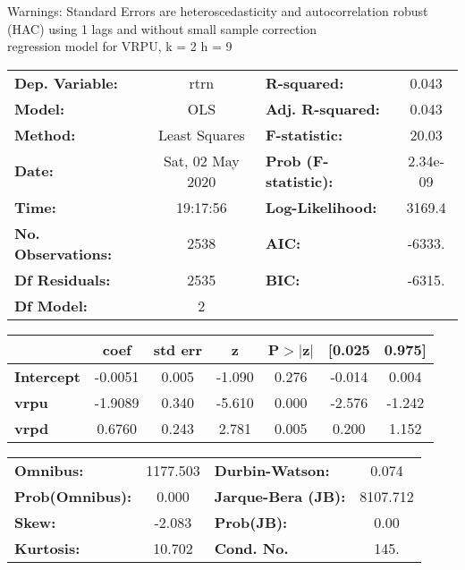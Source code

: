 Warnings: \newline
 [1] Standard Errors are heteroscedasticity and autocorrelation robust (HAC) using 1 lags and without small sample correction\\ 

regression model for VRPU, k = 2 h = 9\begin{center}
\begin{tabular}{lclc}
\toprule
\textbf{Dep. Variable:}    &       rtrn       & \textbf{  R-squared:         } &     0.043   \\
\textbf{Model:}            &       OLS        & \textbf{  Adj. R-squared:    } &     0.043   \\
\textbf{Method:}           &  Least Squares   & \textbf{  F-statistic:       } &     20.03   \\
\textbf{Date:}             & Sat, 02 May 2020 & \textbf{  Prob (F-statistic):} &  2.34e-09   \\
\textbf{Time:}             &     19:17:56     & \textbf{  Log-Likelihood:    } &    3169.4   \\
\textbf{No. Observations:} &        2538      & \textbf{  AIC:               } &    -6333.   \\
\textbf{Df Residuals:}     &        2535      & \textbf{  BIC:               } &    -6315.   \\
\textbf{Df Model:}         &           2      & \textbf{                     } &             \\
\bottomrule
\end{tabular}
\begin{tabular}{lcccccc}
                   & \textbf{coef} & \textbf{std err} & \textbf{z} & \textbf{P$> |$z$|$} & \textbf{[0.025} & \textbf{0.975]}  \\
\midrule
\textbf{Intercept} &      -0.0051  &        0.005     &    -1.090  &         0.276        &       -0.014    &        0.004     \\
\textbf{vrpu}      &      -1.9089  &        0.340     &    -5.610  &         0.000        &       -2.576    &       -1.242     \\
\textbf{vrpd}      &       0.6760  &        0.243     &     2.781  &         0.005        &        0.200    &        1.152     \\
\bottomrule
\end{tabular}
\begin{tabular}{lclc}
\textbf{Omnibus:}       & 1177.503 & \textbf{  Durbin-Watson:     } &    0.074  \\
\textbf{Prob(Omnibus):} &   0.000  & \textbf{  Jarque-Bera (JB):  } & 8107.712  \\
\textbf{Skew:}          &  -2.083  & \textbf{  Prob(JB):          } &     0.00  \\
\textbf{Kurtosis:}      &  10.702  & \textbf{  Cond. No.          } &     145.  \\
\bottomrule
\end{tabular}
\end{center}

